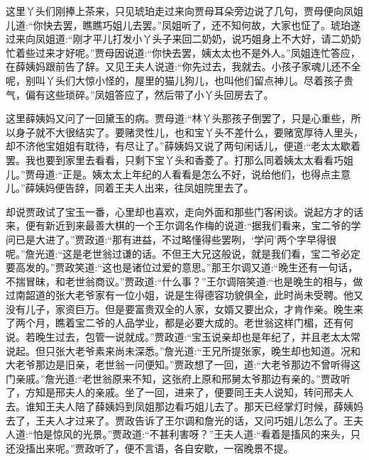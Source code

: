 \begin{parag}
    这里丫头们刚捧上茶来，只见琥珀走过来向贾母耳朵旁边说了几句，贾母便向凤姐儿道:“你快去罢，瞧瞧巧姐儿去罢。”凤姐听了，还不知何故，大家也怔了。琥珀遂过来向凤姐道:“刚才平儿打发小丫头子来回二奶奶，说巧姐身上不大好，请二奶奶忙着些过来才好呢。”贾母因说道:“你快去罢，姨太太也不是外人。”凤姐连忙答应，在薛姨妈跟前告了辞。又见王夫人说道:“你先过去，我就去。小孩子家魂儿还不全呢，别叫丫头们大惊小怪的，屋里的猫儿狗儿，也叫他们留点神儿。尽着孩子贵气，偏有这些琐碎。”凤姐答应了，然后带了小丫头回房去了。
\end{parag}


\begin{parag}
    这里薛姨妈又问了一回黛玉的病。贾母道:“林丫头那孩子倒罢了，只是心重些，所以身子就不大很结实了。要赌灵性儿，也和宝丫头不差什么，要赌宽厚待人里头，却不济他宝姐姐有耽待，有尽让了。”薛姨妈又说了两句闲话儿，便道:“老太太歇着罢。我也要到家里去看看，只剩下宝丫头和香菱了。打那么同着姨太太看看巧姐儿。”贾母道:“正是。姨太太上年纪的人看看是怎么不好，说给他们，也得点主意儿。”薛姨妈便告辞，同着王夫人出来，往凤姐院里去了。
\end{parag}


\begin{parag}
    却说贾政试了宝玉一番，心里却也喜欢，走向外面和那些门客闲谈。说起方才的话来，便有新近到来最善大棋的一个王尔调名作梅的说道:“据我们看来，宝二爷的学问已是大进了。”贾政道:“那有进益，不过略懂得些罢咧，‘学问’两个字早得很呢。”詹光道:“这是老世翁过谦的话。不但王大兄这般说，就是我们看，宝二爷必定要高发的。”贾政笑道:“这也是诸位过爱的意思。”那王尔调又道:“晚生还有一句话，不揣冒昧，和老世翁商议。”贾政道:“什么事？”王尔调陪笑道:“也是晚生的相与，做过南韶道的张大老爷家有一位小姐，说是生得德容功貌俱全，此时尚未受聘。他又没有儿子，家资巨万。但是要富贵双全的人家，女婿又要出众，才肯作亲。晚生来了两个月，瞧着宝二爷的人品学业，都是必要大成的。老世翁这样门楣，还有何说。若晚生过去，包管一说就成。”贾政道:“宝玉说亲却也是年纪了，并且老太太常说起。但只张大老爷素来尚未深悉。”詹光道:“王兄所提张家，晚生却也知道。况和大老爷那边是旧亲，老世翁一问便知。”贾政想了一回，道:“大老爷那边不曾听得这门亲戚。”詹光道:“老世翁原来不知，这张府上原和邢舅太爷那边有亲的。”贾政听了，方知是邢夫人的亲戚。坐了一回，进来了，便要同王夫人说知，转问邢夫人去。谁知王夫人陪了薛姨妈到凤姐那边看巧姐儿去了。那天已经掌灯时候，薛姨妈去了，王夫人才过来了。贾政告诉了王尔调和詹光的话，又问巧姐儿怎么了。王夫人道:“怕是惊风的光景。”贾政道:“不甚利害呀？”王夫人道:“看着是搐风的来头，只还没搐出来呢。”贾政听了，便不言语，各自安歇，一宿晚景不提。
\end{parag}


